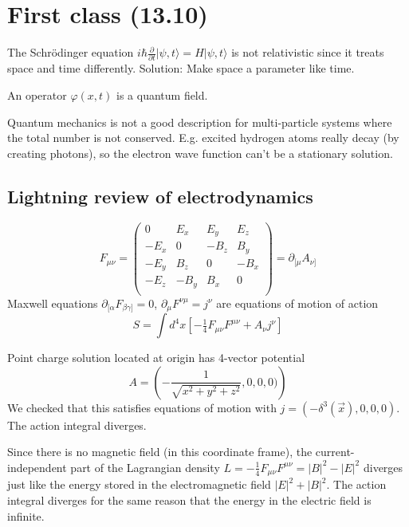 \documentclass[12pt]{article}
\begin{document}
\newpage


\section{First class (13.10)}

The Schrödinger equation $i\hbar\frac{\partial}{\partial
  t}|\psi,t\rangle = H|\psi,t\rangle$ is not relativistic since it
treats space and time differently. Solution: Make space a parameter
like time.
\begin{definition}
  An operator $\varphi(x,t)$ is a quantum field.
\end{definition}
Quantum mechanics is not a good description for
multi-particle systems where the total number is not
conserved. E.g. excited hydrogen atoms really decay (by creating
photons), so the electron wave function can't be a stationary
solution.

\subsection{Lightning review of electrodynamics}

\begin{equation}
  F_{\mu\nu} =
  \begin{pmatrix}
    0 & E_x & E_y & E_z \\
    -E_x & 0 & -B_z & B_y \\
    - E_y & B_z & 0 & -B_x \\
    -E_z & -B_y & B_x & 0 \\
  \end{pmatrix}
  = \partial_{[\mu} A_{\nu]}
\end{equation}
Maxwell equations $\partial_{[\alpha} F_{\beta\gamma]} = 0$,
$\partial_\mu F^{\nu\mu}=j^\nu$ are equations of motion of action
\begin{equation}
  S = \int d^4x \left[- \tfrac{1}{4} F_{\mu\nu} F^{\mu\nu} + A_\nu j^\nu\right]
\end{equation}

\begin{example}
  Point charge solution located at origin has 4-vector
  potential
  \begin{equation}
    A = \left(
      -\frac{1}{\sqrt{x^2+y^2+z^2}}, 0, 0, 0)
    \right)
  \end{equation}
  We checked that this satisfies equations of motion with
  $j=(-\delta^3(\vec{x}), 0, 0, 0)$. The action integral diverges.
\end{example}
Since there is no magnetic field (in this coordinate frame), the
current-independent part of the Lagrangian density $L=- \tfrac{1}{4}
F_{\mu\nu} F^{\mu\nu} = |B|^2-|E|^2$ diverges just like the energy
stored in the electromagnetic field $|E|^2 + |B|^2$. The action
integral diverges for the same reason that the energy in the electric
field is infinite. 
\end{document}
